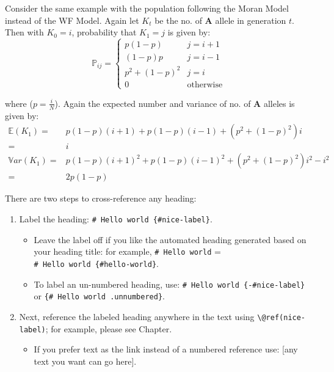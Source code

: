 \documentclass[
]{book}
\providecommand{\tightlist}{%
  \setlength{\itemsep}{0pt}\setlength{\parskip}{0pt}}
\theoremstyle{definition}
\theoremstyle{definition}
\theoremstyle{definition}
\theoremstyle{definition}
\theoremstyle{remark}
\begin{document}
Consider the same example with the population following the Moran Model instead of the WF Model. Again let \(K_t\) be the no. of \textbf{A} allele in generation \(t\). Then with \(K_0=i\), probability that \(K_1=j\) is given by: \[ \mathbb{P}_{ij} = \begin{cases} p(1-p) & j=i+1 \\ (1-p)p & j=i-1 \\ p^2 + (1-p)^2 & j=i \\ 0 & \text{otherwise} \end{cases}    \]

where (\(p=\frac{i}{N}\)). Again the expected number and variance of no. of \textbf{A} alleles is given by: \[\begin{align*}  \mathbb{E}(K_1) =& p(1-p)(i+1) + p(1-p)(i-1) + (p^2+(1-p)^2)i \\ =& i \\  \mathbb{V}ar(K_1) =& p(1-p)(i+1)^2 + p(1-p)(i-1)^2 + (p^2+(1-p)^2)i^2  -i^2 \\ =& 2p(1-p)  \end{align*}\]

There are two steps to cross-reference any heading:

\begin{enumerate}
\def\labelenumi{\arabic{enumi}.}
\tightlist
\item
  Label the heading: \texttt{\#\ Hello\ world\ \{\#nice-label\}}.

  \begin{itemize}
  \tightlist
  \item
    Leave the label off if you like the automated heading generated based on your heading title: for example, \texttt{\#\ Hello\ world} = \texttt{\#\ Hello\ world\ \{\#hello-world\}}.
  \item
    To label an un-numbered heading, use: \texttt{\#\ Hello\ world\ \{-\#nice-label\}} or \texttt{\{\#\ Hello\ world\ .unnumbered\}}.
  \end{itemize}
\item
  Next, reference the labeled heading anywhere in the text using \texttt{\textbackslash{}@ref(nice-label)}; for example, please see Chapter.

  \begin{itemize}
  \tightlist
  \item
    If you prefer text as the link instead of a numbered reference use: {[}any text you want can go here{]}.
  \end{itemize}
\end{enumerate}
\end{document}
